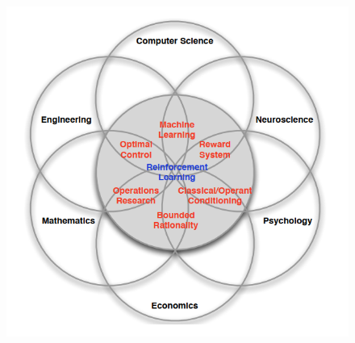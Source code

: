 \begin{figure}
	\centering
	\includegraphics[width=0.7\linewidth]{Figures/RL/RL-chart}
	\caption{}
	\label{fig:rl-chart}
\end{figure}
